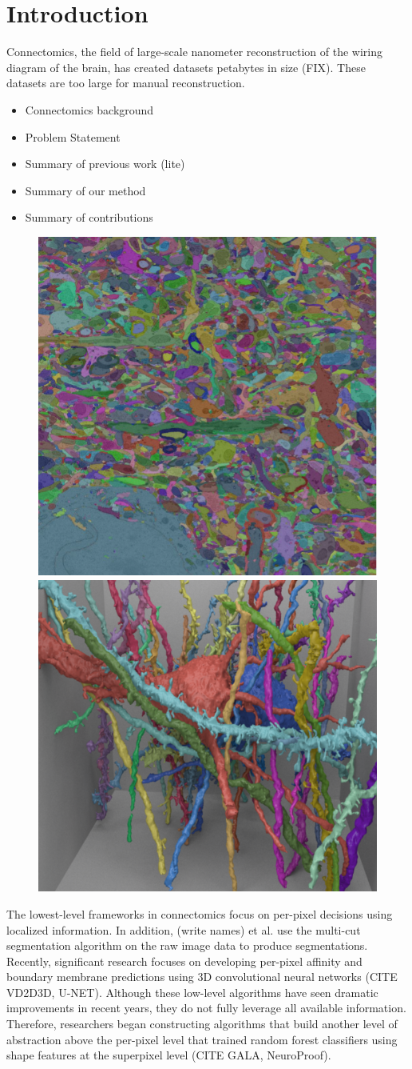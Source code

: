 \section{Introduction}

Connectomics, the field of large-scale nanometer reconstruction of the wiring diagram of the brain, has created datasets petabytes in size (FIX). These datasets are too large for manual reconstruction. 



\begin{itemize}
	\item Connectomics background
	\item Problem Statement
	\item Summary of previous work (lite)
	\item Summary of our method
	\item Summary of contributions
\end{itemize}

\begin{figure}
	\centering
	\includegraphics[width=0.42\linewidth]{./figures/intro-slice.png}
	\hspace{0.085\linewidth}
	\includegraphics[width=0.42\linewidth]{./figures/intro-cube.png}
\end{figure}

The lowest-level frameworks in connectomics focus on per-pixel decisions using localized information. 
In addition, (write names) et al. use the multi-cut segmentation algorithm on the raw image data to produce segmentations.
Recently, significant research focuses on developing per-pixel affinity and boundary membrane predictions using 3D convolutional neural networks (CITE VD2D3D, U-NET).
Although these low-level algorithms have seen dramatic improvements in recent years, they do not fully leverage all available information.
Therefore, researchers began constructing algorithms that build another level of abstraction above the per-pixel level that trained random forest classifiers using shape features at the superpixel level (CITE GALA, NeuroProof).

